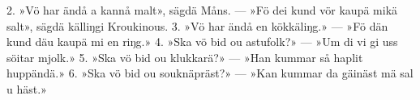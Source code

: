 2.  »Vö har ändå a kannå malt», sägdä Måns. —
    »Fö dei kund vör kaupä mikä salt», sägdä källiŋgi Kroukinous.
3.  »Vö har ändå en kökkäliŋg.» —
    »Fö dän kund däu kaupä mi en riŋg.»
4.  »Ska vö bid ou astufolk?» —
    »Um di vi gi uss söitar mjolk.»
5.  »Ska vö bid ou klukkarä?» —
    »Han kummar så haplit huppändä.»
6.  »Ska vö bid ou souknäpräst?» —
    »Kan kummar da gäinäst mä sal u häst.»
